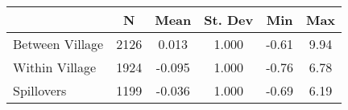 \begin{tabular}{l*{5}{c}}\hline&\multicolumn{1}{c}{N}&\multicolumn{1}{c}{Mean}&\multicolumn{1}{c}{St. Dev}&\multicolumn{1}{c}{Min}&\multicolumn{1}{c}{Max}\\ \hline 
Between Village & 2126 & 0.013 & 1.000 & -0.61 & 9.94 \\
Within Village & 1924 & -0.095 & 1.000 & -0.76 & 6.78 \\
Spillovers & 1199 & -0.036 & 1.000 & -0.69 & 6.19 \\
\hline \end{tabular}
